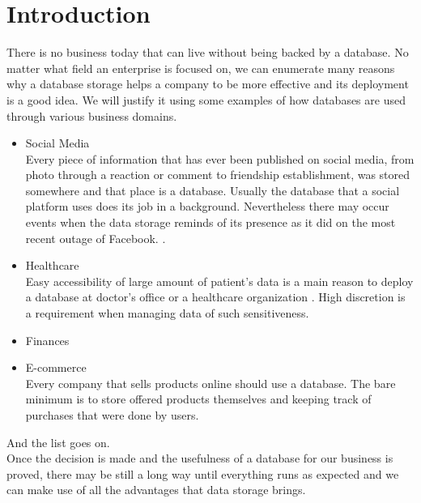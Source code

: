 \chapter{Introduction}

There is no business today that can live without being backed by a database.
No matter what field an enterprise is focused on, we can enumerate many reasons why a database storage helps a company to be more effective and its deployment is a good idea.
We will justify it using some examples of how databases are used through various business domains.

\begin{itemize}
	
	\item Social Media \\
	Every piece of information that has ever been published on social media, from photo through a reaction or comment to friendship establishment, was stored somewhere and that place is a database. Usually the database that a social platform uses does its job in a background. Nevertheless there may occur events when the data storage reminds of its presence as it did on the most recent outage of Facebook. \cite{Facebook19}.
	
	\item Healthcare \\
	Easy accessibility of large amount of patient's data is a main reason to deploy a database at doctor's office or a healthcare organization \cite{Healthcare13}. High discretion is a requirement when managing data of such sensitiveness.
	
	\item Finances \\
	
	\item E-commerce \\
	Every company that sells products online should use a database. The bare minimum is to store offered products themselves and keeping track of purchases that were done by users.
	
	
\end{itemize}
And the list goes on.
\\

Once the decision is made and the usefulness of a database for our business is proved, there may be still a long way until everything runs as expected and we can make use of all the advantages that data storage brings.

